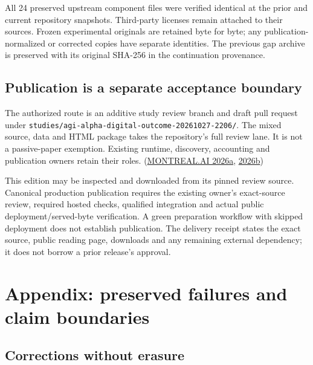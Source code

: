 \documentclass[
  10pt,
]{article}
\begin{document}
All 24 preserved upstream component files were verified identical at the
prior and current repository snapshots. Third-party licenses remain
attached to their sources. Frozen experimental originals are retained
byte for byte; any publication-normalized or corrected copies have
separate identities. The previous gap archive is preserved with its
original SHA-256 in the continuation provenance.

\hypertarget{publication-is-a-separate-acceptance-boundary}{%
\subsection{Publication is a separate acceptance
boundary}\label{publication-is-a-separate-acceptance-boundary}}

The authorized route is an additive study review branch and draft pull
request under \texttt{studies/agi-alpha-digital-outcome-20261027-2206/}.
The mixed source, data and HTML package takes the repository's full
review lane. It is not a passive-paper exemption. Existing runtime,
discovery, accounting and publication owners retain their roles.
(\protect\hyperlink{ref-coordination}{MONTREAL.AI 2026a},
\protect\hyperlink{ref-publication}{2026b})

This edition may be inspected and downloaded from its pinned review
source. Canonical production publication requires the existing owner's
exact-source review, required hosted checks, qualified integration and
actual public deployment/served-byte verification. A green preparation
workflow with skipped deployment does not establish publication. The
delivery receipt states the exact source, public reading page, downloads
and any remaining external dependency; it does not borrow a prior
release's approval.

\clearpage

\hypertarget{appendix-preserved-failures-and-claim-boundaries}{%
\section{Appendix: preserved failures and claim
boundaries}\label{appendix-preserved-failures-and-claim-boundaries}}

\hypertarget{corrections-without-erasure}{%
\subsection{Corrections without
erasure}\label{corrections-without-erasure}}
\end{document}

